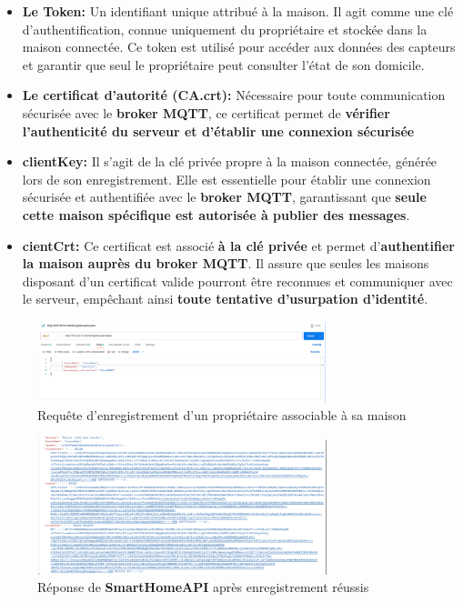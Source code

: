 \documentclass[10pt, a4paper]{report}
\begin{document}
	\begin{itemize}
		\item \textbf{Le Token:} Un identifiant unique attribué à la maison. Il agit comme une clé d’authentification, connue uniquement du propriétaire et stockée dans la maison connectée. Ce token est utilisé pour accéder aux données des capteurs et garantir que seul le propriétaire peut consulter l’état de son domicile.
		
		\item \textbf{Le certificat d’autorité (CA.crt):} Nécessaire pour toute communication sécurisée avec le \textbf{broker MQTT}, ce certificat permet de \textbf{vérifier l’authenticité du serveur et d’établir une connexion sécurisée}
		
		\item \textbf{clientKey:} Il s’agit de la clé privée propre à la maison connectée, générée lors de son enregistrement. Elle est essentielle pour établir une connexion sécurisée et authentifiée avec le \textbf{broker MQTT}, garantissant que \textbf{seule cette maison spécifique est autorisée à publier des messages}.
		
		\item \textbf{cientCrt: }Ce certificat est associé \textbf{à la clé privée} et permet d’\textbf{authentifier la maison auprès du broker MQTT}. Il assure que seules les maisons disposant d’un certificat valide pourront être reconnues et communiquer avec le serveur, empêchant ainsi \textbf{toute tentative d’usurpation d’identité}. 
	\end{itemize}
	
	\begin{figure}[h!]
		\centering
		\includegraphics[width=0.75\textwidth]{ressources/img/preuves/creerMaisonRequete}
		\caption{Requête d'enregistrement d'un propriétaire associable à sa maison}
		\label{fig:preuveRequeteCreate}
	\end{figure}
	
	\begin{figure}[h!]
		\centering
		\includegraphics[width=0.75\textwidth]{ressources/img/preuves/creerMaisonReponse}
		\caption{Réponse de \textbf{SmartHomeAPI} après enregistrement réussis}
		\label{fig:preuveResponseCreate}
	\end{figure}
	
\end{document}

